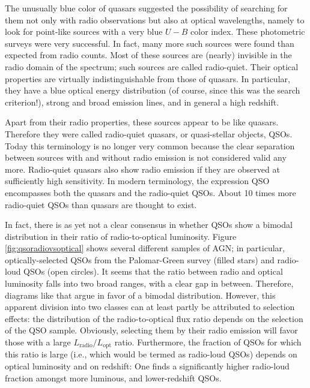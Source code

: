 \documentclass[a4paper,10pt]{article}
\begin{document}
{\noindent}The unusually blue color of quasars suggested the possibility of searching for them not only with radio observations but also at optical wavelengths, namely to look for point-like sources with a very blue $U-B$ color index. These photometric surveys were very successful. In fact, many more such sources were found than expected from radio counts. Most of these sources are (nearly) invisible in the radio domain of the spectrum; such sources are called radio-quiet. Their optical properties are virtually indistinguishable from those of quasars. In particular, they have a blue optical energy distribution (of course, since this was the search criterion!), strong and broad emission lines, and in general a high redshift.

{\noindent}Apart from their radio properties, these sources appear to be like quasars. Therefore they were called radio-quiet quasars, or quasi-stellar objects, QSOs. Today this terminology is no longer very common because the clear separation between sources with and without radio emission is not considered valid any more. Radio-quiet quasars also show radio emission if they are observed at sufficiently high sensitivity. In modern terminology, the expression QSO encompasses both the quasars and the radio-quiet QSOs. About 10 times more radio-quiet QSOs than quasars are thought to exist.

{\noindent}In fact, there is as yet not a clear consensus in whether QSOs show a bimodal distribution in their ratio of radio-to-optical luminosity. Figure \ref{fig:qsoradiovsoptical} shows several different samples of AGN; in particular, optically-selected QSOs from the Palomar-Green survey (filled stars) and radio-loud QSOs (open circles). It seems that the ratio between radio and optical luminosity falls into two broad ranges, with a clear gap in between. Therefore, diagrams like that argue in favor of a bimodal distribution. However, this apparent division into two classes can at least partly be attributed to selection effects: the distribution of the radio-to-optical flux ratio depends on the selection of the QSO sample. Obviously, selecting them by their radio emission will favor those with a large $L_\mathrm{radio}/L_\mathrm{opt}$ ratio. Furthermore, the fraction of QSOs for which this ratio is large (i.e., which would be termed as radio-loud QSOs) depends on optical luminosity and on redshift: One finds a significantly higher radio-loud fraction amongst more luminous, and lower-redshift QSOs.
\end{document}
